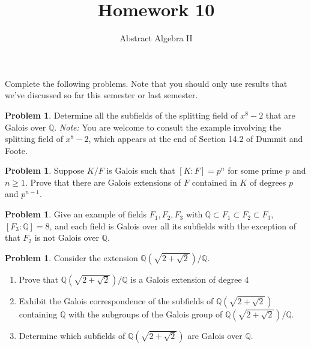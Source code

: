 \documentclass[11pt]{scrartcl}
\theoremstyle{definition}
\newtheorem{problem}[theorem]{Problem}
\begin{document}
\title{Homework 10}
\subtitle{Abstract Algebra II}
\date{}

\maketitle
\thispagestyle{fancy}

Complete the following problems. Note that you should only use results that we've discussed so far this semester or last semester.

\begin{problem}
Determine all the subfields of the splitting field of $x^8-2$ that are Galois over $\mathbb{Q}$.  \emph{Note:} You are welcome to consult the example involving the splitting field of $x^8-2$, which appears at the end of Section 14.2 of Dummit and Foote.
\end{problem}


\begin{problem}
Suppose $K/F$ is Galois such that $[K:F]=p^n$ for some prime $p$ and $n\geq 1$. Prove that there are Galois extensions of $F$ contained in $K$ of degrees $p$ and $p^{n-1}$.
\end{problem}

\begin{problem}
Give an example of fields $F_1, F_2, F_3$ with $\mathbb{Q}\subset F_1\subset F_2\subset F_3$, $[F_3:\mathbb{Q}]=8$, and each field is Galois over all its subfields with the exception of that $F_2$ is not Galois over $\mathbb{Q}$.
\end{problem}

\begin{problem}
Consider the extension $\mathbb{Q}(\sqrt{2+\sqrt{2}})/\mathbb{Q}$.
\begin{enumerate}[label=\rm{(\alph*)}]
\item Prove that $\mathbb{Q}(\sqrt{2+\sqrt{2}})/\mathbb{Q}$ is a Galois extension of degree 4
\item Exhibit the Galois correspondence of the subfields of $\mathbb{Q}(\sqrt{2+\sqrt{2}})$ containing $\mathbb{Q}$ with the subgroups of the Galois group of $\mathbb{Q}(\sqrt{2+\sqrt{2}})/\mathbb{Q}$.
\item Determine which subfields of $\mathbb{Q}(\sqrt{2+\sqrt{2}})$ are Galois over $\mathbb{Q}$.
\end{enumerate}
\end{problem}
\end{document}
